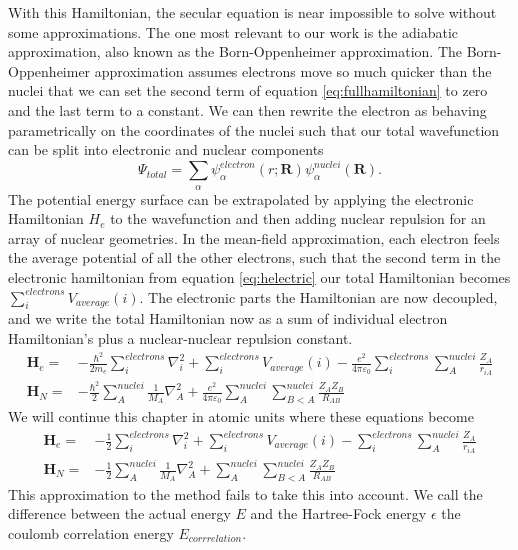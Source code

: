 With this Hamiltonian, the secular equation is near impossible to solve without some approximations.
The one most relevant to our work is the adiabatic approximation, also known as the Born-Oppenheimer approximation.
The Born-Oppenheimer approximation assumes electrons move so much quicker than the nuclei that we can set the second term of equation \ref{eq:fullhamiltonian} to zero and the last term to a constant. \cite{born1954dynamical,born1927quantentheorie}
We can then rewrite the electron as behaving parametrically on the coordinates of the nuclei such that our total wavefunction can be split into electronic and nuclear components
\begin{equation}
  \Psi_{total} = \sum_\alpha\psi_\alpha^{electron}(r;\mathbf{R})\psi_\alpha^{nuclei}(\mathbf{R}).
\end{equation}
The potential energy surface can be extrapolated by applying the electronic Hamiltonian $H_e$ to the wavefunction and then adding nuclear repulsion for an array of nuclear geometries.
In the mean-field approximation, each electron feels the average potential of all the other electrons, such that the second term in the electronic hamiltonian from equation \ref{eq:helectric} our total Hamiltonian becomes $\sum_i^{electrons} V_{average}(i)$.
The electronic parts the Hamiltonian are now decoupled, and we write the total Hamiltonian now as a sum of individual electron Hamiltonian's plus a nuclear-nuclear repulsion constant.
\begin{align}
  \label{eq:helectric}
  \mathbf{H}_e =& -\frac{\hbar^2}{2m_e}\sum_i^{electrons}\nabla_i^2 + \sum_i^{electrons} V_{average}(i) - \frac{e^2}{4\pi\varepsilon_0} \sum_i^{electrons}\sum_A^{nuclei}\frac{Z_A}{r_{iA}} \\
  \mathbf{H}_N =& -\frac{\hbar^2}{2}\sum_{A}^{nuclei}\frac{1}{M_{A}}\nabla_{A}^2  + \frac{e^2}{4\pi\varepsilon_0}\sum_{A}^{nuclei}\sum_{B<A}^{nuclei}\frac{Z_AZ_B}{R_{AB}}
\end{align}
We will continue this chapter in atomic units where these equations become
\begin{align}
  \label{eq:helectric}
  \mathbf{H}_e =& -\frac{1}{2}\sum_i^{electrons}\nabla_i^2 + \sum_i^{electrons} V_{average}(i) -  \sum_i^{electrons}\sum_A^{nuclei}\frac{Z_A}{r_{iA}} \\
  \mathbf{H}_N =& -\frac{1}{2}\sum_{A}^{nuclei}\frac{1}{M_{A}}\nabla_{A}^2  + \sum_{A}^{nuclei}\sum_{B<A}^{nuclei}\frac{Z_AZ_B}{R_{AB}}
\end{align}
This approximation to the method fails to take this into account.
We call the difference between the actual energy $E$ and the Hartree-Fock energy $\epsilon$ the
coulomb correlation energy $E_{corrrelation}$.

